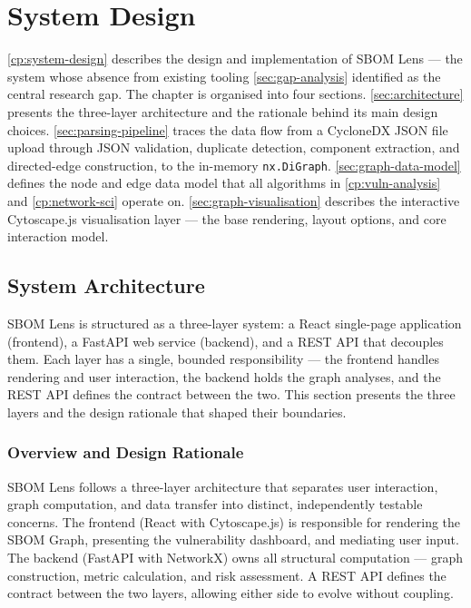 \chapter[System Design]{System Design}
\label{cp:system-design}

\autoref{cp:system-design} describes the design and implementation of SBOM Lens --- the system whose absence from existing tooling \autoref{sec:gap-analysis} identified as the central research gap. The chapter is organised into four sections. \autoref{sec:architecture} presents the three-layer architecture and the rationale behind its main design choices. \autoref{sec:parsing-pipeline} traces the data flow from a CycloneDX JSON file upload through JSON validation, duplicate detection, component extraction, and directed-edge construction, to the in-memory \texttt{nx.DiGraph}. \autoref{sec:graph-data-model} defines the node and edge data model that all algorithms in \autoref{cp:vuln-analysis} and \autoref{cp:network-sci} operate on. \autoref{sec:graph-visualisation} describes the interactive Cytoscape.js visualisation layer --- the base rendering, layout options, and core interaction model.


\section{System Architecture}
\label{sec:architecture}

SBOM Lens is structured as a three-layer system: a React single-page application (frontend), a FastAPI web service (backend), and a REST API that decouples them. Each layer has a single, bounded responsibility --- the frontend handles rendering and user interaction, the backend holds the graph analyses, and the REST API defines the contract between the two. This section presents the three layers and the design rationale that shaped their boundaries.


\subsection{Overview and Design Rationale}
\label{sec:architecture-overview}

SBOM Lens follows a three-layer architecture that separates user interaction, graph computation, and data transfer into distinct, independently testable concerns. The frontend (React with Cytoscape.js) is responsible for rendering the SBOM Graph, presenting the vulnerability dashboard, and mediating user input. The backend (FastAPI with NetworkX) owns all structural computation --- graph construction, metric calculation, and risk assessment. A REST API defines the contract between the two layers, allowing either side to evolve without coupling.

